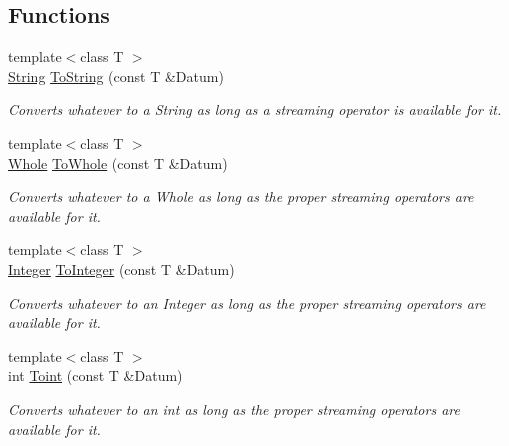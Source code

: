 \subsection*{Functions}
\begin{DoxyCompactItemize}
\item 
{\footnotesize template$<$class T $>$ }\\\hyperlink{namespacephys_aa03900411993de7fbfec4789bc1d392e}{String} \hyperlink{namespacephys_ae81e34843c6c569026b9a7d9d54c4f04}{ToString} (const T \&Datum)
\begin{DoxyCompactList}\small\item\em Converts whatever to a String as long as a streaming operator is available for it. \item\end{DoxyCompactList}\item 
{\footnotesize template$<$class T $>$ }\\\hyperlink{namespacephys_a460f6bc24c8dd347b05e0366ae34f34a}{Whole} \hyperlink{namespacephys_a53d44a46cab542ef86a541af5f1a7b62}{ToWhole} (const T \&Datum)
\begin{DoxyCompactList}\small\item\em Converts whatever to a Whole as long as the proper streaming operators are available for it. \item\end{DoxyCompactList}\item 
{\footnotesize template$<$class T $>$ }\\\hyperlink{namespacephys_a7f09bf5585b2bb97613cd9aad4273a81}{Integer} \hyperlink{namespacephys_a7fe8a4cf645e000483652f26ef8d6e47}{ToInteger} (const T \&Datum)
\begin{DoxyCompactList}\small\item\em Converts whatever to an Integer as long as the proper streaming operators are available for it. \item\end{DoxyCompactList}\item 
{\footnotesize template$<$class T $>$ }\\int \hyperlink{namespacephys_af0a6dfb0aa9e9292b96a0273e1f49d3a}{Toint} (const T \&Datum)
\begin{DoxyCompactList}\small\item\em Converts whatever to an int as long as the proper streaming operators are available for it. \item\end{DoxyCompactList}\item 

\end{DoxyCompactItemize}
